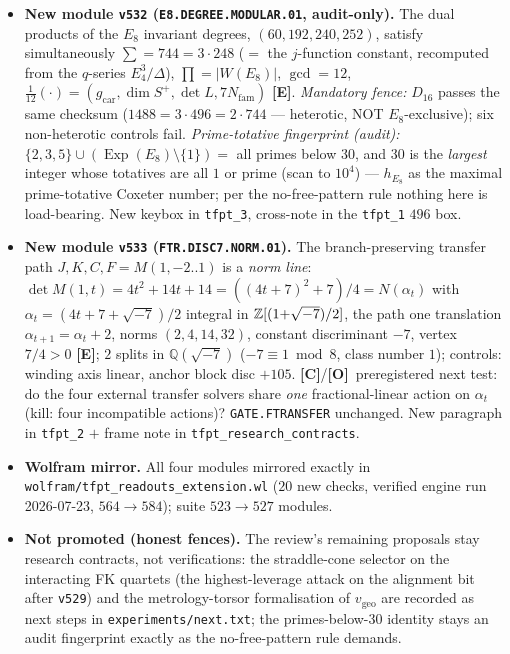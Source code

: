 \documentclass[11pt]{article}
\providecommand{\mE}{\textbf{[E]}}\providecommand{\mC}{\textbf{[C]}}
\providecommand{\mO}{\textbf{[O]}}\providecommand{\mX}{\textbf{[X]}}
\providecommand{\vref}[1]{\texttt{#1}}
\providecommand{\gcar}{g_{\mathrm{car}}}\providecommand{\Nfam}{N_{\mathrm{fam}}}
\begin{document}
\begin{itemize}[leftmargin=1.5em]
clock as \emph{one integer operator}); Ramanujan trace tomography $\operatorname{tr}(T_{30}^k)=c_{30}(k)
=c_5(k)c_6(k)$ for all $k$, signed table $(-1,1,2,4,-2,-4,-8,8)$, atom readout $(2,4,8)=
(|\Z_2|,|\mu_4|,\operatorname{rank}E_8)$; honest kill scope ($\Phi_{15}$ passes the unsigned triple ---
the \emph{signed} table discriminates; $\Phi_{16}/\Phi_{20}/\Phi_{24}$ die on the triple). The flip-atlas
intertwiner (\texttt{COX.FLIP.INTERTWINER}) and Stage B stay \mO; \texttt{tfpt\_1} Stage A prose updated.
\item \textbf{New module \texttt{v532} (\texttt{E8.DEGREE.MODULAR.01}, audit-only).} The dual products of the
$E_8$ invariant degrees, $(60,192,240,252)$, satisfy simultaneously $\sum=744=3\cdot248$ ($=$ the
$j$-function constant, recomputed from the $q$-series $E_4^3/\Delta$), $\prod=|W(E_8)|$, $\gcd=12$,
$\tfrac1{12}(\cdot)=(\gcar,\dim S^+,\det L,7\Nfam)$ \mE. \emph{Mandatory fence:} $D_{16}$ passes the same
checksum ($1488=3\cdot496=2\cdot744$ --- heterotic, NOT $E_8$-exclusive); six non-heterotic controls fail.
\emph{Prime-totative fingerprint (audit):} $\{2,3,5\}\cup(\operatorname{Exp}(E_8)\setminus\{1\})=$ all
primes below $30$, and $30$ is the \emph{largest} integer whose totatives are all $1$ or prime (scan to
$10^4$) --- $h_{E_8}$ as the maximal prime-totative Coxeter number; per the no-free-pattern rule nothing
here is load-bearing. New keybox in \texttt{tfpt\_3}, cross-note in the \texttt{tfpt\_1} $496$ box.
\item \textbf{New module \texttt{v533} (\texttt{FTR.DISC7.NORM.01}).} The branch-preserving transfer path
$J,K,C,F=M(1,-2..1)$ is a \emph{norm line}: $\det M(1,t)=4t^2{+}14t{+}14=((4t{+}7)^2{+}7)/4
=N(\alpha_t)$ with $\alpha_t=(4t{+}7{+}\sqrt{-7})/2$ integral in $\mathbb{Z}[(1{+}\sqrt{-7})/2]$, the path one
translation $\alpha_{t+1}=\alpha_t+2$, norms $(2,4,14,32)$, constant discriminant $-7$, vertex $7/4>0$
\mE; $2$ splits in $\mathbb Q(\sqrt{-7})$ ($-7\equiv1\bmod8$, class number $1$); controls: winding axis linear,
anchor block disc $+105$. \mC/\mO\ preregistered next test: do the four external transfer solvers share
\emph{one} fractional-linear action on $\alpha_t$ (kill: four incompatible actions)?
\texttt{GATE.FTRANSFER} unchanged. New paragraph in \texttt{tfpt\_2} $+$ frame note in
\texttt{tfpt\_research\_contracts}.
\item \textbf{Wolfram mirror.} All four modules mirrored exactly in
\texttt{wolfram/tfpt\_readouts\_extension.wl} ($20$ new checks, verified engine run 2026-07-23,
$564\to584$); suite $523\to527$ modules.
\item \textbf{Not promoted (honest fences).} The review's remaining proposals stay research contracts, not
verifications: the straddle-cone selector on the interacting FK quartets (the highest-leverage attack on
the alignment bit after \vref{v529}) and the metrology-torsor formalisation of $v_{\mathrm{geo}}$ are
recorded as next steps in \texttt{experiments/next.txt}; the primes-below-$30$ identity stays an audit
fingerprint exactly as the no-free-pattern rule demands.
\end{itemize}
\end{document}
